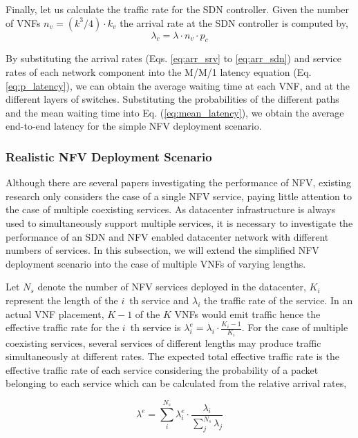 Finally, let us calculate the traffic rate for the SDN controller. Given the number of VNFs $n_v = (k^3 / 4) \cdot k_v$ the arrival rate at the SDN controller is computed by,
\begin{equation}
    \label{eq:arr_sdn}
    \lambda_c = \lambda \cdot n_v \cdot p_c
\end{equation}

By substituting the arrival rates (Eqs. \ref{eq:arr_srv} to \ref{eq:arr_sdn}) and service rates of each network component into the M/M/1 latency equation (Eq. \ref{eq:p_latency}), we can obtain the average waiting time at each VNF, and at the different layers of switches. Substituting the probabilities of the different paths and the mean waiting time into Eq. (\ref{eq:mean_latency}), we obtain the average end-to-end latency for the simple NFV deployment scenario.

\subsubsection{Realistic NFV Deployment Scenario}
\label{sec:realistic}

Although there are several papers investigating the performance of NFV, existing research only considers the case of a single NFV service, paying little attention to the case of multiple coexisting services. As datacenter infrastructure is always used to simultaneously support multiple services, it is necessary to investigate the performance of an SDN and NFV enabled datacenter network with different numbers of services. In this subsection, we will extend the simplified NFV deployment scenario into the case of multiple VNFs of varying lengths.

Let $N_s$ denote the number of NFV services deployed in the datacenter, $K_i$ represent the length of the $i$~th service and $\lambda_i$ the traffic rate of the service. In an actual VNF placement, $K-1$ of the $K$ VNFs would emit traffic hence the effective traffic rate for the $i$~th service is $\lambda_{i}^{e} = \lambda_{i} \cdot \frac{K_i-1}{K_i}$. For the case of multiple coexisting services, several services of different lengths may produce traffic simultaneously at different rates. The expected total effective traffic rate is the effective traffic rate of each service considering the probability of a packet belonging to each service which can be calculated from the relative arrival rates,

\begin{equation}
    \label{eq:effective_arrival}
    \lambda^e = \sum_i^{N_s} \lambda_i^e \cdot \frac{\lambda_i}{\sum_j^{N_s} \lambda_j}
\end{equation}

